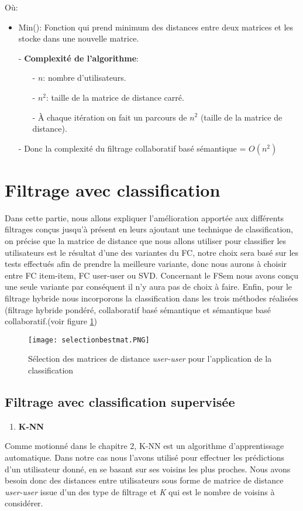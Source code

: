 Où:
\begin{itemize}
	\item Min(): Fonction qui prend minimum des distances entre deux matrices et les stocke dans une nouvelle matrice.
\end{itemize}

\begin{itemize}
	\item [-] \textbf{Complexité de l'algorithme}:
	\begin{itemize}
		\item [-] $n$: nombre d'utilisateurs.
		\item [-] $n^2$: taille de la matrice de distance carré.
		\item [-] À chaque itération on fait un parcours de $n^2$ (taille de la matrice de distance).
	\end{itemize}
	\item [-]  Donc la complexité du filtrage collaboratif basé sémantique = $O(n^2)$
\end{itemize}


\section{Filtrage avec classification}
Dans cette partie, nous allons expliquer l'amélioration apportée aux différents filtrages conçus jusqu'à présent en leurs ajoutant une technique de classification, on précise que la matrice de distance que nous allons utiliser pour classifier les utilisateurs est le résultat d'une des variantes du FC, notre choix sera basé sur les tests effectués afin de prendre la meilleure variante, donc nous aurons à choisir entre FC item-item, FC user-user ou SVD. Concernant le FSem nous avons conçu une seule variante par conséquent il n'y aura pas de choix à faire. Enfin, pour le filtrage hybride nous incorporons la classification dans les trois méthodes réalisées (filtrage hybride pondéré, collaboratif basé sémantique et sémantique basé collaboratif.(voir figure \ref{fig:selec})

\begin{figure}[H]
	\centering
	\texttt{[image: selectionbestmat.PNG]}
	\caption{Sélection des matrices de distance \textit{user-user} pour l'application de la classification}
	\label{fig:selec}
\end{figure}

\subsection{Filtrage avec classification supervisée}
\begin{enumerate}[nosep,label=\textbf{\arabic*)}]
	\item \textbf{K-NN}
\end{enumerate}\mbox{}\indent Comme motionné dans le chapitre 2, K-NN est un algorithme d'apprentissage automatique. Dans notre cas nous l'avons utilisé pour effectuer les prédictions d'un utilisateur donné, en se basant sur ses voisins les plus proches. Nous avons besoin donc des distances entre utilisateurs sous forme de matrice de distance \textit{user-user} issue d'un des type de filtrage et \textit{K} qui est le nombre de voisins à considérer.

